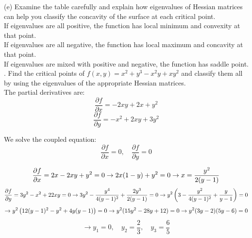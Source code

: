 \documentclass{article} %
\begin{document}
{    \noindent (e) Examine the table carefully and explain how eigenvalues of Hessian matrices can help you classify
    the concavity of the surface at each critical point.\\

    If eigenvalues are all positive, the function has local minimum and convexity at that point. \\
    If eigenvalues are all negative, the function has local maximum and concavity at that point. \\
    If eigenvalues are mixed with positive and negative, the function has saddle point. \\

    . Find the critical points of $ f(x, y) = x^2 + y^3 - x^2y + xy^2 $ and classify them all by using the eigenvalues
    of the appropriate Hessian matrices. \\

    The partial derivatives are:
    \[ \frac{\partial f}{\partial x} = - 2 x y + 2 x + y^{2} \]
    \[ \frac{\partial f}{\partial y} = - x^{2} + 2 x y + 3 y^{2} \]

    We solve the coupled equation:
    \[ \frac{\partial f}{\partial x} = 0, \quad \frac{\partial f}{\partial y} = 0 \]

    \[ \frac{\partial f}{\partial x} = 2x - 2xy + y^2 = 0 \\\\
    \rightarrow 2x(1 - y) + y^2 = 0 \\\\
    \rightarrow x = \frac{y^2}{2(y - 1)} \]
    \[ \frac{\partial f}{\partial y} = 3y^2 - x^2 + 22xy = 0 \\\\
    \rightarrow 3y^2 - \frac{y^4}{4(y - 1)^2} + \frac{2y^3}{2(y - 1)} = 0 \\\\[10pt]
    \rightarrow y^2 \left(3 - \frac{y^2}{4(y - 1)^2} + \frac{y}{y - 1} \right) = 0 \\\\\]
    \[ \rightarrow y^2 \left(12(y - 1)^2 - y^2 + 4y(y - 1) \right) = 0 \\\\[10pt]
    \rightarrow y^2 (15y^2 - 28y + 12) = 0 \\\\[10pt]
    \rightarrow y^2{(3y - 2)(5y - 6)} = 0 \\\]
    \[ \rightarrow y_1 = 0, \quad y_2 = \frac{2}{3}, \quad y_3 = \frac{6}{5} \]

}
\end{document}
